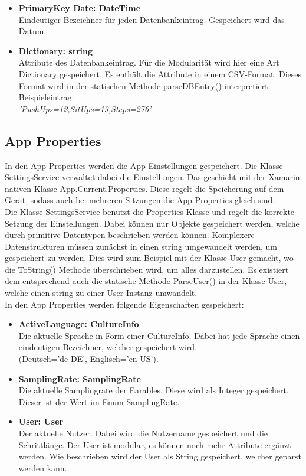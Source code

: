 \documentclass[a4paper,12pt]{article}
\begin{document}
\begin{itemize}
	\item \textbf{PrimaryKey Date: DateTime}\\Eindeutiger Bezeichner für jeden Datenbankeintrag. Gespeichert wird das Datum.
	\item \textbf{Dictionary: string}\\Attribute des Datenbankeintrag. Für die Modularität wird hier eine Art Dictionary gespeichert. Es enthält die Attribute in einem \gls{CSV}-Format. Dieses Format wird in der statischen Methode parseDBEntry() interpretiert. Beispieleintrag:\\ \textit{'PushUps=12,SitUps=19,Steps=276'}
\end{itemize}
 
\subsection{App Properties}
In den App Properties werden die App Einstellungen gespeichert. Die Klasse SettingsService verwaltet dabei die Einstellungen. Das geschieht mit der Xamarin nativen Klasse App.Current.Properties. Diese regelt die Speicherung auf dem Gerät, sodass auch bei mehreren Sitzungen die App Properties gleich sind.\\
Die Klasse SettingsService benutzt die Properties Klasse und regelt die korrekte Setzung der Einstellungen. Dabei können nur Objekte gespeichert werden, welche durch primitive Datentypen beschrieben werden können. Komplexere Datenstrukturen müssen zunächst in einen string umgewandelt werden, um gespeichert zu werden. Dies wird zum Beispiel mit der Klasse User gemacht, wo die ToString() Methode überschrieben wird, um alles darzustellen. Es existiert dem entsprechend auch die statische Methode ParseUser() in der Klasse User, welche einen string zu einer User-Instanz umwandelt.
\\In den App Properties werden folgende Eigenschaften gespeichert:
\begin{itemize}
	\item \textbf{ActiveLanguage: CultureInfo}\\Die aktuelle Sprache in Form einer CultureInfo. Dabei hat jede Sprache einen eindeutigen Bezeichner, welcher gespeichert wird.\\ (Deutsch='de-DE', Englisch='en-US').
	\item \textbf{SamplingRate: SamplingRate}\\Die aktuelle Samplingrate der \Gls{Earables}. Diese wird als Integer gespeichert. Dieser ist der Wert im Enum SamplingRate.
	\item \textbf{User: User}\\Der aktuelle Nutzer. Dabei wird die Nutzername gespeichert und die Schrittlänge. Der User ist modular, es können noch mehr Attribute ergänzt werden.  Wie beschrieben wird der User als String gespeichert, welcher geparst werden kann.
\end{itemize}
\end{document}
